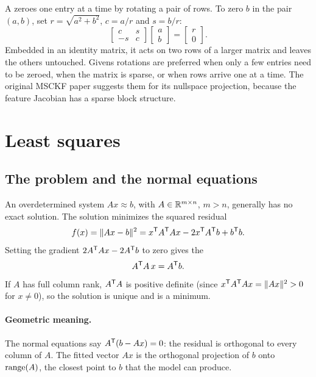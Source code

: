 A  zeroes one entry at a time by rotating a pair of rows. To zero $b$ in the pair $(a, b)$, set
$r = \sqrt{a^2 + b^2}$, $c = a/r$ and $s = b/r$:
\begin{equation}
  \begin{bmatrix} c & s \\ -s & c \end{bmatrix}\begin{bmatrix} a \\ b \end{bmatrix} = \begin{bmatrix} r \\ 0 \end{bmatrix}.
\end{equation}
Embedded in an identity matrix, it acts on two rows of a larger matrix and leaves the others untouched. Givens rotations are
preferred when only a few entries need to be zeroed, when the matrix is sparse, or when rows arrive one at a time. The original
MSCKF paper suggests them for its nullspace projection, because the feature Jacobian has a sparse block structure.

\section{Least squares}
\label{sec:least-squares}

\subsection{The problem and the normal equations}

An overdetermined system $Ax \approx b$, with $A \in \mathbb{R}^{m\times n}$, $m > n$, generally has no exact solution. The 
solution minimizes the squared residual
\begin{equation}
  f(x) = \|Ax - b\|^2 = x^{\mathsf{T}} A^{\mathsf{T}} Ax - 2x^{\mathsf{T}} A^{\mathsf{T}} b + b^{\mathsf{T}} b .
\end{equation}
Setting the gradient $2A^{\mathsf{T}} Ax - 2A^{\mathsf{T}} b$ to zero gives the 
\begin{equation}
  A^{\mathsf{T}} A\,x = A^{\mathsf{T}} b .
  \label{eq:normal-equations}
\end{equation}
If $A$ has full column rank, $A^{\mathsf{T}} A$ is positive definite (since $x^{\mathsf{T}} A^{\mathsf{T}} Ax = \|Ax\|^2 > 0$ for $x\ne0$), so the solution is unique and is
a minimum.

\paragraph{Geometric meaning.} The normal equations say $A^{\mathsf{T}}(b - Ax) = 0$: the residual is orthogonal to every column of $A$. The fitted
vector $Ax$ is the orthogonal projection of $b$ onto $\operatorname{range}(A)$, the closest point to $b$ that the model can produce.

